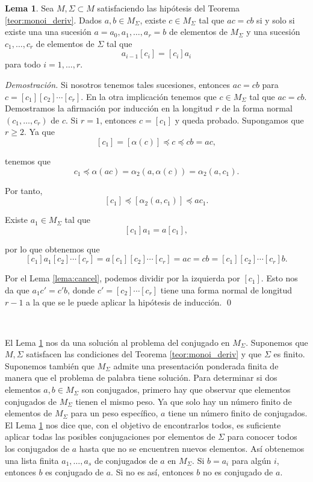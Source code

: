 \documentclass[12pt]{article}
\theoremstyle{definition}
\newtheorem{lema}{Lema}[section]
\begin{document}
\begin{lema}
Sea $M,\Sigma\subset M$ satisfaciendo las hipótesis del Teorema \ref{teor:monoi_deriv}. Dados $a,b\in M_\Sigma$, existe $c\in M_\Sigma$ tal que $ac=cb$ si y solo si existe una una sucesión $a=a_0,a_1,\ldots,a_r=b$ de elementos de $M_\Sigma$ y una sucesión $c_1,\ldots,c_r$ de elementos de $\Sigma$ tal que
$$a_{i-1}[c_i]=[c_i]a_i$$
para todo $i=1,\ldots,r$.

\label{lema:conjugado}
\end{lema}

\textit{Demostración.} Si nosotros tenemos tales sucesiones, entonces $ac=cb$ para $c=[c_1][c_2]\cdots[c_r]$. En la otra implicación tenemos que $c\in M_\Sigma$ tal que $ac=cb$. Demostramos la afirmación por inducción en la longitud $r$ de la forma normal $(c_1,\ldots,c_r)$ de $c$. Si $r=1$, entonces $c = [c_1]$ y queda probado. Supongamos que $r\geq 2$. Ya que
$$[c_1]=[\alpha(c)]\preceq c \preceq cb = ac,$$

tenemos que
$$c_1\preceq\alpha(ac)=\alpha_2(a,\alpha(c))=\alpha_2(a,c_1).$$

Por tanto,
$$[c_1]\preceq [\alpha_2(a,c_1)]\preceq ac_1.$$

Existe $a_1\in M_\Sigma$ tal que
$$[c_1]a_1=a[c_1],$$

por lo que obtenemos que 
$$[c_1]a_1[c_2]\cdots[c_r]=a[c_1][c_2]\cdots[c_r]=ac=cb=[c_1][c_2]\cdots[c_r]b.$$

Por el Lema \ref{lema:cancel}, podemos dividir por la izquierda por $[c_1]$. Esto nos da que $a_1c'=c'b$, donde $c'=[c_2]\cdots[c_r]$ tiene una forma normal de longitud $r-1$ a la que se le puede aplicar la hipótesis de inducción. \qed

\ 

El Lema \ref{lema:conjugado} nos da una solución al problema del conjugado en $M_\Sigma$. Suponemos que $M,\Sigma$ satisfacen las condiciones del Teorema \ref{teor:monoi_deriv} y que $\Sigma$ es finito. Suponemos también que $M_\Sigma$ admite una presentación ponderada finita de manera que el problema de palabra tiene solución. Para determinar si dos elementos $a,b\in M_\Sigma$ son conjugados, primero hay que observar que elementos conjugados de $M_\Sigma$ tienen el mismo peso. Ya que solo hay un número finito de elementos de $M_\Sigma$ para un peso específico, $a$ tiene un número finito de conjugados. El Lema \ref{lema:conjugado} nos dice que, con el objetivo de encontrarlos todos, es suficiente aplicar todas las posibles conjugaciones por elementos de $\Sigma$ para conocer todos los conjugados de $a$ hasta que no se encuentren nuevos elementos. Así obtenemos una lista finita $a_1,\ldots,a_s$ de conjugados de $a$ en $M_\Sigma$. Si $b=a_i$ para algún $i$, entonces $b$ es conjugado de $a$. Si no es así, entonces $b$ no es conjugado de $a$.
\end{document}
